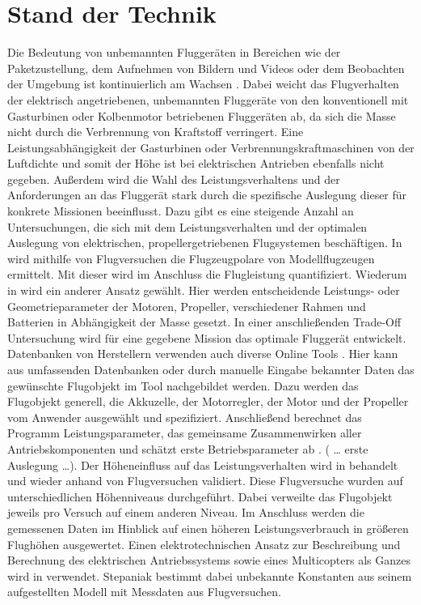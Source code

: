 \section{Stand der Technik}
\label{sec:stand_der_technik}
Die Bedeutung von unbemannten Fluggeräten in Bereichen wie der Paketzustellung, dem Aufnehmen von Bildern und Videos oder dem Beobachten der Umgebung ist kontinuierlich am Wachsen . Dabei weicht das Flugverhalten der elektrisch angetriebenen, unbemannten Fluggeräte von den konventionell mit Gasturbinen oder Kolbenmotor betriebenen Fluggeräten ab, da sich die Masse nicht durch die Verbrennung von Kraftstoff verringert. Eine Leistungsabhängigkeit der Gasturbinen oder Verbrennungskraftmaschinen von der Luftdichte und somit der Höhe ist bei elektrischen Antrieben ebenfalls nicht gegeben. Außerdem wird die Wahl des Leistungsverhaltens und der Anforderungen an das Fluggerät stark durch die spezifische Auslegung dieser für konkrete Missionen beeinflusst. 
Dazu gibt es eine steigende Anzahl an Untersuchungen, die sich mit dem Leistungsverhalten und der optimalen Auslegung von elektrischen, propellergetriebenen Flugsystemen beschäftigen. In \cite{Ostler.2006} wird mithilfe von Flugversuchen die Flugzeugpolare von Modellflugzeugen ermittelt. Mit dieser wird im Anschluss die Flugleistung quantifiziert. Wiederum in \cite{KARI.2017} wird ein anderer Ansatz gewählt. Hier werden entscheidende Leistungs- oder Geometrieparameter der Motoren, Propeller, verschiedener Rahmen und Batterien in Abhängigkeit der Masse gesetzt. In einer anschließenden Trade-Off Untersuchung wird für eine gegebene Mission das optimale Fluggerät entwickelt. Datenbanken von Herstellern verwenden auch diverse Online Tools \cite{Drivecalc,eCalc,Flyeval}. Hier kann aus umfassenden Datenbanken oder durch manuelle Eingabe bekannter Daten das gewünschte Flugobjekt im Tool nachgebildet werden. Dazu werden das Flugobjekt generell, die Akkuzelle, der Motorregler, der Motor und der Propeller vom Anwender ausgewählt und spezifiziert. Anschließend berechnet das Programm Leistungsparameter, das gemeinsame Zusammenwirken aller Antriebskomponenten und schätzt erste Betriebsparameter ab . ( … erste Auslegung …). Der Höheneinfluss auf das Leistungsverhalten wird in \cite{PCUP.2017} behandelt und wieder anhand von Flugversuchen validiert. Diese Flugversuche wurden auf unterschiedlichen Höhenniveaus durchgeführt. Dabei verweilte das Flugobjekt jeweils pro Versuch auf einem anderen Niveau. Im Anschluss werden die gemessenen Daten im Hinblick auf einen höheren Leistungsverbrauch in größeren Flughöhen ausgewertet. Einen elektrotechnischen Ansatz zur Beschreibung und Berechnung des elektrischen Antriebssystems sowie eines Multicopters als Ganzes wird in \cite{Quan.2017,Shi.2017,Stepaniak.2009} verwendet. Stepaniak bestimmt dabei unbekannte Konstanten aus seinem aufgestellten Modell mit Messdaten aus Flugversuchen. 
